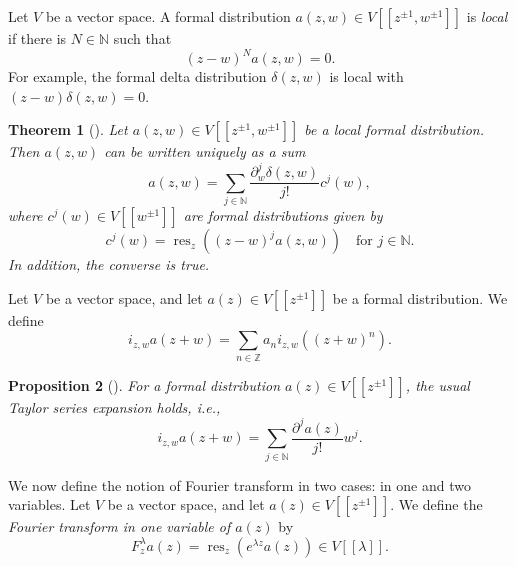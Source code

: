 \documentclass[a4paper, 12pt, reqno]{amsart}
\newtheorem{theorem}{Theorem}[section]
\newtheorem{proposition}[theorem]{Proposition}
\theoremstyle{remark}
\DeclareMathOperator{\res}{res}
\begin{document}
Let $V$ be a vector space.
A formal distribution $a(z, w) \in V[[z^{\pm 1}, w^{\pm 1}]]$ is \emph{local} if there is $N \in \mathbb{N}$ such that
\begin{equation*}
  (z - w)^Na(z, w)=0.
\end{equation*}
For example, the formal delta distribution $\delta(z, w)$ is local with $(z - w)\delta(z, w) = 0$.

\begin{theorem}[{\cite[Proposition 2.2]{kac_vertex_1998}}]
  \label{thr:6}
  Let $a(z, w) \in V[[z^{\pm 1}, w^{\pm 1}]]$ be a local formal distribution.
  Then $a(z, w)$ can be written uniquely as a sum
  \begin{equation*}
    a(z, w) = \sum_{j \in \mathbb{N}}\frac{\partial_w^j\delta(z, w)}{j!}c^j(w),
  \end{equation*}
  where $c^j(w) \in V[[w^{\pm 1}]]$ are formal distributions given by
  \begin{equation*}
    c^j(w) = \res_z((z - w)^ja(z, w)) \quad \text{for $j \in \mathbb{N}$}.
  \end{equation*}
  In addition, the converse is true.
\end{theorem}

Let $V$ be a vector space, and let $a(z) \in V[[z^{\pm 1}]]$ be a formal distribution.
We define
\begin{equation*}
  i_{z, w}a(z + w) = \sum_{n \in \mathbb{Z}} a_ni_{z, w}((z + w)^n).
\end{equation*}

\begin{proposition}[{\cite[Proposition 3.4.1]{nozaradan_introduction_2008}}]
  \label{prp:1}
  For a formal distribution $a(z) \in V[[z^{\pm 1}]]$, the usual Taylor series expansion holds, i.e.,
  \begin{equation*}
    i_{z, w}a(z + w) = \sum_{j \in \mathbb{N}}\frac{\partial^ja(z)}{j!}w^j.
  \end{equation*}
\end{proposition}

We now define the notion of Fourier transform in two cases: in one and two variables.
Let $V$ be a vector space, and let $a(z) \in V[[z^{\pm 1}]]$.
We define the \emph{Fourier transform in one variable of $a(z)$} by
\begin{equation*}
  F^{\lambda}_za(z) = \res_z(e^{\lambda z}a(z)) \in V[[\lambda]].
\end{equation*}
\end{document}

